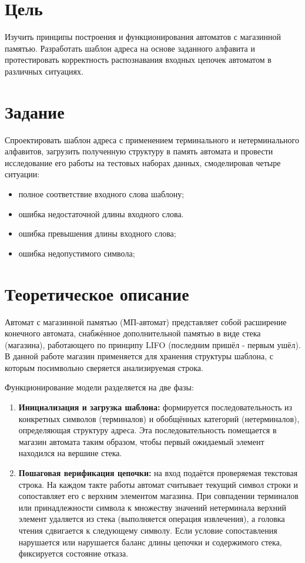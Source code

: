 \documentclass[oneside,a4paper,14pt]{extarticle}
\begin{document}
\newpage
\clearpage

\section*{Цель}
Изучить принципы построения и функционирования автоматов с магазинной памятью. Разработать шаблон адреса на основе заданного алфавита и протестировать корректность распознавания входных цепочек автоматом в различных ситуациях.

\section*{Задание}
Спроектировать шаблон адреса с применением терминального и нетерминального алфавитов, загрузить полученную структуру в память автомата и провести исследование его работы на тестовых наборах данных, смоделировав четыре ситуации:
\begin{itemize}
	\item полное соответствие входного слова шаблону;
	\item ошибка недостаточной длины входного слова.
	\item ошибка превышения длины входного слова;
	\item ошибка недопустимого символа;
\end{itemize}

\section*{Теоретическое описание}
Автомат с магазинной памятью (МП-автомат) представляет собой расширение конечного автомата, снабжённое дополнительной памятью в виде стека (магазина), работающего по принципу LIFO (последним пришёл - первым ушёл). В данной работе магазин применяется для хранения структуры шаблона, с которым посимвольно сверяется анализируемая строка.

Функционирование модели разделяется на две фазы:
\begin{enumerate}
	\item \textbf{Инициализация и загрузка шаблона:} формируется последовательность из конкретных символов (терминалов) и обобщённых категорий (нетерминалов), определяющая структуру адреса. Эта последовательность помещается в магазин автомата таким образом, чтобы первый ожидаемый элемент находился на вершине стека.
	\item \textbf{Пошаговая верификация цепочки:} на вход подаётся проверяемая текстовая строка. На каждом такте работы автомат считывает текущий символ строки и сопоставляет его с верхним элементом магазина. При совпадении терминалов или принадлежности символа к множеству значений нетерминала верхний элемент удаляется из стека (выполняется операция извлечения), а головка чтения сдвигается к следующему символу. Если условие сопоставления нарушается или нарушается баланс длины цепочки и содержимого стека, фиксируется состояние отказа.
\end{enumerate}
\end{document}
